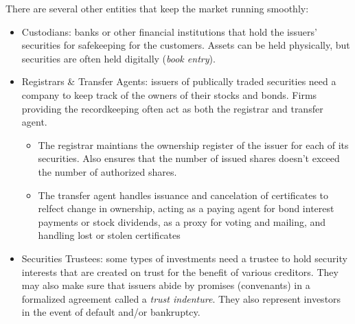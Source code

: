 There are several other entities that keep the market running smoothly:
\vspace{-1.5ex}
\begin{itemize}[label=\footnotesize$\bullet$, itemsep=0.5em]
  \item Custodians: banks or other financial institutions that hold the issuers' securities for safekeeping for the customers. Assets can be held physically, but securities are often held digitally (\textit{book entry}).
  \item Registrars \& Transfer Agents: issuers of publically traded securities need a company to keep track of the owners of their stocks and bonds. Firms providing the recordkeeping often act as both the registrar and transfer agent.
  \begin{itemize}[label=$\circ$, itemsep=0.3em]
    \item The registrar maintians the ownership register of the issuer for each of its securities. Also ensures that the number of issued shares doesn't exceed the number of authorized shares. 
    \item The transfer agent handles issuance and cancelation of certificates to relfect change in ownership, acting as a paying agent for bond interest payments or stock dividends, as a proxy for voting and mailing, and handling lost or stolen certificates
  \end{itemize}
  \item Securities Trustees: some types of investments need a trustee to hold security interests that are created on trust for the benefit of various creditors. They may also make sure that issuers abide by promises (convenants) in a formalized agreement called a \textit{trust indenture}. They also represent investors in the event of default and/or bankruptcy.
\end{itemize}